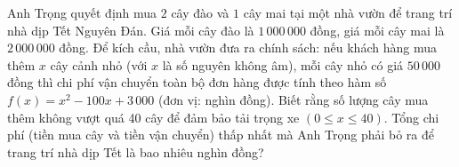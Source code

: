 \begin{ex}%
	Anh Trọng quyết định mua $2$ cây đào và $1$ cây mai tại một nhà vườn để trang trí nhà dịp Tết Nguyên Đán. Giá mỗi cây đào là $1\,000\,000$ đồng, giá mỗi cây mai là $2\,000\,000$ đồng. Để kích cầu, nhà vườn đưa ra chính sách: nếu khách hàng mua thêm $x$  cây cảnh nhỏ (với $x$  là số nguyên không âm), mỗi cây nhỏ có giá $50\,000$ đồng thì chi phí vận chuyển toàn bộ đơn hàng được tính theo hàm số $f(x)=x^2-100x+3\,000$  (đơn vị: nghìn đồng). Biết rằng số lượng cây mua thêm không vượt quá 40 cây để đảm bảo tải trọng xe $(0 \leq x \leq 40)$. Tổng chi phí (tiền mua cây và tiền vận chuyển) thấp nhất mà Anh Trọng phải bỏ ra để trang trí nhà dịp Tết là bao nhiêu nghìn đồng?
\end{ex}

